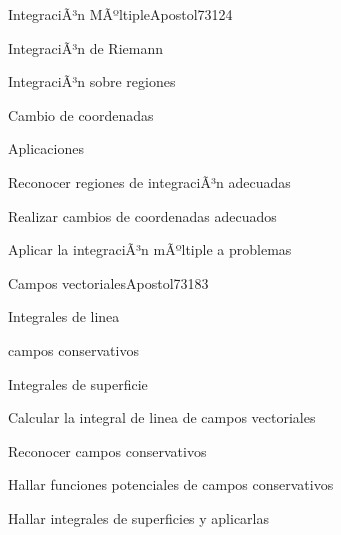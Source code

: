 \begin{syllabus}
\begin{unit}{IntegraciÃ³n MÃºltiple}{Apostol73}{12}{4}
   \begin{topics}
      \item IntegraciÃ³n de Riemann
      \item IntegraciÃ³n sobre regiones
      \item Cambio de coordenadas
      \item Aplicaciones
      \end{topics}

   \begin{learningoutcomes}
      \item Reconocer regiones de integraciÃ³n adecuadas
      \item Realizar cambios de coordenadas adecuados
      \item Aplicar la integraciÃ³n mÃºltiple a problemas
      \end{learningoutcomes}
\end{unit}

\begin{unit}{Campos vectoriales}{Apostol73}{18}{3}
   \begin{topics}
      \item Integrales de linea
      \item campos conservativos
      \item Integrales de superficie
   \end{topics}

   \begin{learningoutcomes}
      \item Calcular la integral de linea de campos vectoriales
      \item Reconocer campos conservativos
      \item Hallar funciones potenciales de campos conservativos
      \item Hallar integrales de superficies y aplicarlas
      \end{learningoutcomes}
\end{unit}



\begin{coursebibliography}
\end{coursebibliography}

\end{syllabus}
